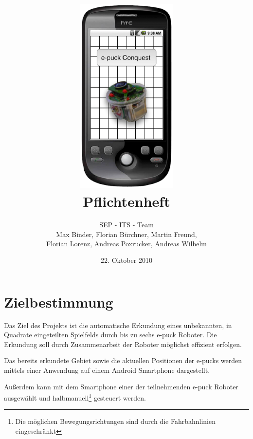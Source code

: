 \documentclass[10pt,a4paper]{article}
\title{
	\includegraphics[height=10cm]{logo.eps} \\
	\vspace{1cm}
	Pflichtenheft
}
\author{SEP - ITS - Team \\ Max Binder, Florian Bürchner, Martin Freund, \\Florian Lorenz,
											Andreas Poxrucker, Andreas Wilhelm}
\let\oldsection\section
\renewcommand{\section}{\newpage \oldsection}
\begin{document}
	\date{22. Oktober 2010}
	\maketitle
	\newpage
	\tableofcontents	
	\newpage
	
	\section{Zielbestimmung}
		Das Ziel des Projekts ist die automatische Erkundung eines unbekannten, in Quadrate eingeteilten Spielfelds durch bis zu
		sechs e-puck Roboter. Die Erkundung soll durch Zusammenarbeit der Roboter möglichst effizient erfolgen.
		
		Das bereits erkundete Gebiet sowie die aktuellen Positionen der e-pucks werden mittels einer Anwendung auf einem Android
		Smartphone dargestellt.	
		
		Außerdem kann mit dem Smartphone einer der teilnehmenden e-puck Roboter ausgewählt und halbmanuell\footnote{Die
			möglichen Bewegungsrichtungen sind durch die Fahrbahnlinien eingeschränkt}  gesteuert werden.
\end{document}
